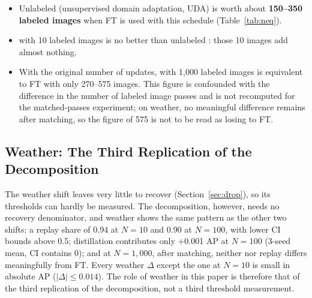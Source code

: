 \begin{itemize}
\item Unlabeled \aldi (unsupervised domain adaptation, UDA) is worth about \textbf{150--350 labeled images} when FT is used with this schedule (Table~\ref{tab:neq}).
\item \aldi with 10 labeled images is no better than unlabeled \aldi: those 10 images add almost nothing.
\item With the original number of updates, \aldi with 1,000 labeled images is equivalent to FT with only 270--575 images. This figure is confounded with the difference in the number of labeled image passes and is not recomputed for the matched-passes experiment; on weather, no meaningful difference remains after matching, so the figure of 575 is not to be read as \aldi losing to FT.
\end{itemize}

\subsection{Weather: The Third Replication of the Decomposition}\label{sec:weather-rep}

The weather shift leaves very little to recover (Section~\ref{sec:drop}), so its thresholds can hardly be measured. The decomposition, however, needs no recovery denominator, and weather shows the same pattern as the other two shifts: a replay share of 0.94 at $N = 10$ and 0.90 at $N = 100$, with lower CI bounds above 0.5; distillation contributes only +0.001 AP at $N = 100$ (3-seed mean, CI contains 0); and at $N = 1{,}000$, after matching, neither \aldi nor replay differs meaningfully from FT. Every weather $\Delta$ except the one at $N = 10$ is small in absolute AP ($|\Delta| \leq 0.014$). The role of weather in this paper is therefore that of the third replication of the decomposition, not a third threshold measurement.
